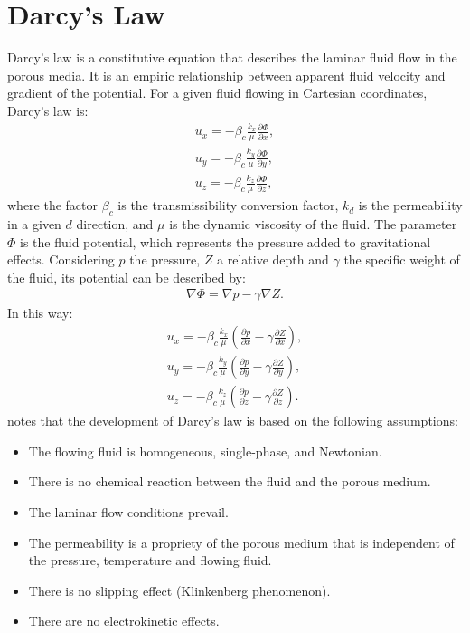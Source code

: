 \section{Darcy's Law}
%
Darcy's law is a constitutive equation that describes the laminar fluid flow in the porous media.
%
It is an empiric relationship between apparent fluid velocity and gradient of the potential.
%
For a given fluid flowing in Cartesian coordinates, Darcy's law is:
%
%
\begin{align}
	\label{equation-darcys-law-potential} \nonumber
	u_x=-\beta_c\frac{k_x}{\mu}\frac{\partial \Phi}{\partial x}, \\ \nonumber
	u_y=-\beta_c\frac{k_y}{\mu}\frac{\partial \Phi}{\partial y}, \\
	u_z=-\beta_c\frac{k_z}{\mu}\frac{\partial \Phi}{\partial z},
\end{align}
%
where the factor $\beta_c$ is the transmissibility conversion factor, $k_d$ is the permeability in a given $d$ direction, and $\mu$ is the dynamic viscosity of the fluid.
%
The parameter $\Phi$ is the fluid potential, which represents the pressure added to gravitational effects.
%
Considering $p$ the pressure, $Z$ a relative depth and $\gamma$ the specific weight of the fluid, its potential can be described by:
%
%
\begin{align}
	\label{equation-potential}
	\nabla \Phi=\nabla p - \gamma \nabla Z.
\end{align}
%
In this way:
%
\begin{align}
	\label{equation-darcys-law} \nonumber
	u_x=-\beta_c\frac{k_x}{\mu}(\frac{\partial p}{\partial x} - \gamma \frac{\partial Z}{\partial x}), \\ \nonumber
	u_y=-\beta_c\frac{k_y}{\mu}(\frac{\partial p}{\partial y} - \gamma \frac{\partial Z}{\partial y}), \\
	u_z=-\beta_c\frac{k_z}{\mu}(\frac{\partial p}{\partial z} - \gamma \frac{\partial Z}{\partial z}).
\end{align}
%
\cite{Ertekin2001} notes that the development of Darcy's law is based on the following assumptions:
%
\begin{itemize}
	\item The flowing fluid is homogeneous, single-phase, and Newtonian.
	\item There is no chemical reaction between the fluid and the porous medium.
	\item The laminar flow conditions prevail.
	\item The permeability is a propriety of the porous medium that is independent of the pressure, temperature and flowing fluid.
	\item There is no slipping effect (Klinkenberg phenomenon).
	\item There are no electrokinetic effects.
	\end{itemize}

